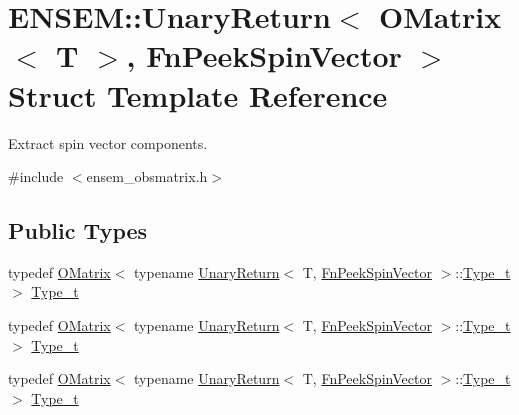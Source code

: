 \hypertarget{structENSEM_1_1UnaryReturn_3_01OMatrix_3_01T_01_4_00_01FnPeekSpinVector_01_4}{}\section{E\+N\+S\+EM\+:\+:Unary\+Return$<$ O\+Matrix$<$ T $>$, Fn\+Peek\+Spin\+Vector $>$ Struct Template Reference}
\label{structENSEM_1_1UnaryReturn_3_01OMatrix_3_01T_01_4_00_01FnPeekSpinVector_01_4}


Extract spin vector components.  




{\ttfamily \#include $<$ensem\+\_\+obsmatrix.\+h$>$}

\subsection*{Public Types}
\begin{DoxyCompactItemize}
\item 
typedef \mbox{\hyperlink{classENSEM_1_1OMatrix}{O\+Matrix}}$<$ typename \mbox{\hyperlink{structENSEM_1_1UnaryReturn}{Unary\+Return}}$<$ T, \mbox{\hyperlink{structENSEM_1_1FnPeekSpinVector}{Fn\+Peek\+Spin\+Vector}} $>$\+::\mbox{\hyperlink{structENSEM_1_1UnaryReturn_3_01OMatrix_3_01T_01_4_00_01FnPeekSpinVector_01_4_a995bd2c849af30377b0fa17937b63f19}{Type\+\_\+t}} $>$ \mbox{\hyperlink{structENSEM_1_1UnaryReturn_3_01OMatrix_3_01T_01_4_00_01FnPeekSpinVector_01_4_a995bd2c849af30377b0fa17937b63f19}{Type\+\_\+t}}
\item 
typedef \mbox{\hyperlink{classENSEM_1_1OMatrix}{O\+Matrix}}$<$ typename \mbox{\hyperlink{structENSEM_1_1UnaryReturn}{Unary\+Return}}$<$ T, \mbox{\hyperlink{structENSEM_1_1FnPeekSpinVector}{Fn\+Peek\+Spin\+Vector}} $>$\+::\mbox{\hyperlink{structENSEM_1_1UnaryReturn_3_01OMatrix_3_01T_01_4_00_01FnPeekSpinVector_01_4_a995bd2c849af30377b0fa17937b63f19}{Type\+\_\+t}} $>$ \mbox{\hyperlink{structENSEM_1_1UnaryReturn_3_01OMatrix_3_01T_01_4_00_01FnPeekSpinVector_01_4_a995bd2c849af30377b0fa17937b63f19}{Type\+\_\+t}}
\item 
typedef \mbox{\hyperlink{classENSEM_1_1OMatrix}{O\+Matrix}}$<$ typename \mbox{\hyperlink{structENSEM_1_1UnaryReturn}{Unary\+Return}}$<$ T, \mbox{\hyperlink{structENSEM_1_1FnPeekSpinVector}{Fn\+Peek\+Spin\+Vector}} $>$\+::\mbox{\hyperlink{structENSEM_1_1UnaryReturn_3_01OMatrix_3_01T_01_4_00_01FnPeekSpinVector_01_4_a995bd2c849af30377b0fa17937b63f19}{Type\+\_\+t}} $>$ \mbox{\hyperlink{structENSEM_1_1UnaryReturn_3_01OMatrix_3_01T_01_4_00_01FnPeekSpinVector_01_4_a995bd2c849af30377b0fa17937b63f19}{Type\+\_\+t}}
\end{DoxyCompactItemize}



